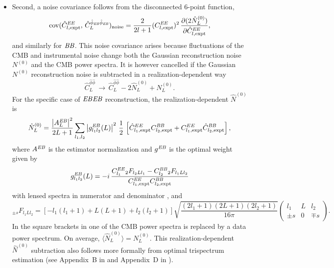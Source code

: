 \begin{itemize}
\item Second, a noise covariance follows from the disconnected 6-point function,
\begin{equation}
  \label{eq:2}
\mathrm{cov}(\hat C^{\mathit{EE}}_{l,\mathrm{expt}}, \,\hat C^{\hat\phi_{\mathit{EB}}\hat\phi_{\mathit{EB}}}_L)_\mathrm{noise}
=
\frac{2}{2l+1}(C^{\mathit{EE}}_{l,\mathrm{expt}})^2 \, \frac{\partial(2\hat N^{(0)}_L)}{\partial \hat C^{\mathit{EE}}_{l,\mathrm{expt}}},
\end{equation}
and similarly for $\mathit{BB}$.
This noise covariance arises because fluctuations of the CMB and instrumental noise change both the Gaussian reconstruction noise $N^{(0)}$ and the CMB power spectra.  It is however cancelled if the Gaussian $N^{(0)}$ reconstruction noise is subtracted in a realization-dependent way \cite{cora0812,duncan1008,Namikawa1209,marcel1308}
\begin{equation}
  \label{eq:RDN0procedure}
  \hat C^{\hat\phi\hat\phi}_L \,\rightarrow \,
\hat C^{\hat\phi\hat\phi}_L - 2 \hat N^{(0)}_L + N^{(0)}_{L}.
\end{equation}
For the specific case of $\mathit{EB}\mathit{EB}$ reconstruction, the realization-dependent $\hat N^{(0)}$ is 
\begin{equation}
  \label{eq:RDN0}
  \hat N^{(0)}_L = \frac{\left|A_L^{\mathit{EB}}\right|^2}{2L+1}\sum_{l_1,l_2} 
\left| g^{\mathit{EB}}_{l_1l_2}(L) \right|^2
\,\frac{1}{2}\,\left[\hat C^{EE}_{l_1,\mathrm{expt}} C^{\mathit{BB}}_{l_2,\mathrm{expt}}+ C^{EE}_{l_1,\mathrm{expt}} \hat C^{\mathit{BB}}_{l_2,\mathrm{expt}}\right],
\end{equation}
where $A^{\mathit{EB}}$ is the estimator normalization and $g^{\mathit{EB}}$ is the optimal weight given by \cite{okamoto03}
\begin{equation}
  \label{eq:gweight}
  g^{\mathit{EB}}_{l_1l_2}(L) = -i\,\frac{C^{\mathit{EE}}_{l_1} {}_{2}F_{l_2Ll_1} - C^{\mathit{BB}}_{l_2}{}_2F_{l_1Ll_2}}{C^{\mathit{EE}}_{l_1,\mathrm{expt}}C^{\mathit{BB}}_{l_2,\mathrm{expt}}}
\end{equation}
with lensed spectra in numerator and denominator \cite{lewis11,duncan1008}, and
\begin{equation}
  \label{eq:BigF}
  {}_{\pm
    s}F_{l_1Ll_2}=[-l_1(l_1+1)+L(L+1)+l_2(l_2+1)]\sqrt{\frac{(2l_1+1)
      (2L+1) (2l_2+1)}{16\pi}}
\left( \begin{matrix} 
l_1 & L & l_2 \\ 
 \pm s & 0 & \mp s
\end{matrix} \right).
\end{equation}
In the square brackets in  one of the CMB power spectra is replaced by a data power spectrum. On average,  $\langle\hat N^{(0)}_L\rangle=N^{(0)}_L$.  This realization-dependent $\hat N^{(0)}$ subtraction also follows more formally from optimal trispectrum estimation (see Appendix~B in \cite{marcel1308} and Appendix~D in \cite{Planck2013Lensing}).

\end{itemize}
